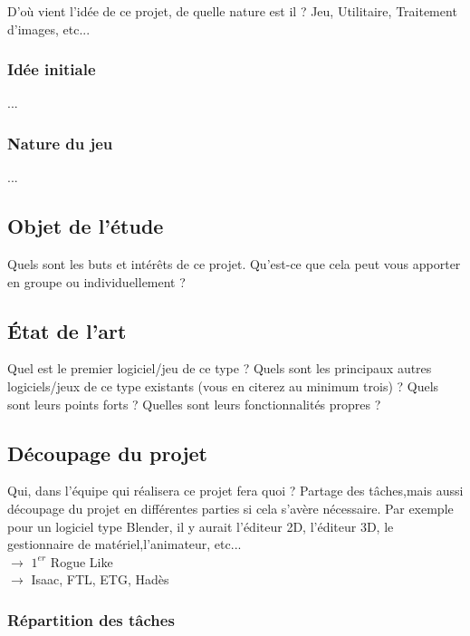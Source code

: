 \documentclass{article}
\begin{document}
D’où vient l’idée de ce projet, de quelle nature est il ? Jeu, Utilitaire, Traitement d’images, etc...

\subsubsection{Idée initiale}

...

\subsubsection{Nature du jeu}

...

\subsection{Objet de l'étude}

Quels sont les buts et intérêts de ce projet. Qu’est-ce que cela peut vous apporter en groupe ou individuellement ?

\subsection{État de l'art}

Quel est le premier logiciel/jeu de ce type ? Quels sont les principaux autres logiciels/jeux de ce type existants (vous en citerez au minimum trois) ? Quels sont leurs points forts ? Quelles sont leurs fonctionnalités propres ?

\subsection{Découpage du projet}

Qui, dans l’équipe qui réalisera ce projet fera quoi ? Partage des tâches,mais aussi découpage du projet en différentes parties si cela s’avère nécessaire. Par exemple pour un logiciel type Blender, il y aurait l’éditeur 2D, l’éditeur 3D, le gestionnaire de matériel,l’animateur, etc... \\
$\rightarrow$ $1^{er}$ Rogue Like \\
$\rightarrow$ Isaac, FTL, ETG, Hadès

\pagebreak

\subsubsection{Répartition des tâches}
\end{document}
